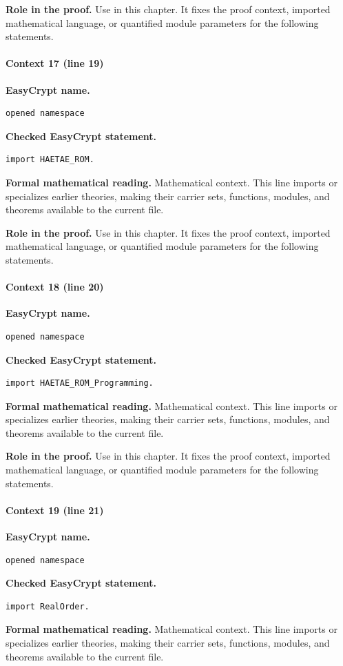 \noindent\textbf{Role in the proof.}
Use in this chapter. It fixes the proof context, imported mathematical language, or quantified module parameters for the following statements.

\paragraph{Context 17 (line 19)}
\noindent\textbf{EasyCrypt name.}
\begin{lstlisting}[language=EasyCrypt,basicstyle=\ttfamily\scriptsize]
opened namespace
\end{lstlisting}
\noindent\textbf{Checked EasyCrypt statement.}
\begin{lstlisting}[language=EasyCrypt,basicstyle=\ttfamily\scriptsize]
import HAETAE_ROM.
\end{lstlisting}
\noindent\textbf{Formal mathematical reading.}
Mathematical context. This line imports or specializes earlier theories, making their carrier sets, functions, modules, and theorems available to the current file.

\noindent\textbf{Role in the proof.}
Use in this chapter. It fixes the proof context, imported mathematical language, or quantified module parameters for the following statements.

\paragraph{Context 18 (line 20)}
\noindent\textbf{EasyCrypt name.}
\begin{lstlisting}[language=EasyCrypt,basicstyle=\ttfamily\scriptsize]
opened namespace
\end{lstlisting}
\noindent\textbf{Checked EasyCrypt statement.}
\begin{lstlisting}[language=EasyCrypt,basicstyle=\ttfamily\scriptsize]
import HAETAE_ROM_Programming.
\end{lstlisting}
\noindent\textbf{Formal mathematical reading.}
Mathematical context. This line imports or specializes earlier theories, making their carrier sets, functions, modules, and theorems available to the current file.

\noindent\textbf{Role in the proof.}
Use in this chapter. It fixes the proof context, imported mathematical language, or quantified module parameters for the following statements.

\paragraph{Context 19 (line 21)}
\noindent\textbf{EasyCrypt name.}
\begin{lstlisting}[language=EasyCrypt,basicstyle=\ttfamily\scriptsize]
opened namespace
\end{lstlisting}
\noindent\textbf{Checked EasyCrypt statement.}
\begin{lstlisting}[language=EasyCrypt,basicstyle=\ttfamily\scriptsize]
import RealOrder.
\end{lstlisting}
\noindent\textbf{Formal mathematical reading.}
Mathematical context. This line imports or specializes earlier theories, making their carrier sets, functions, modules, and theorems available to the current file.

